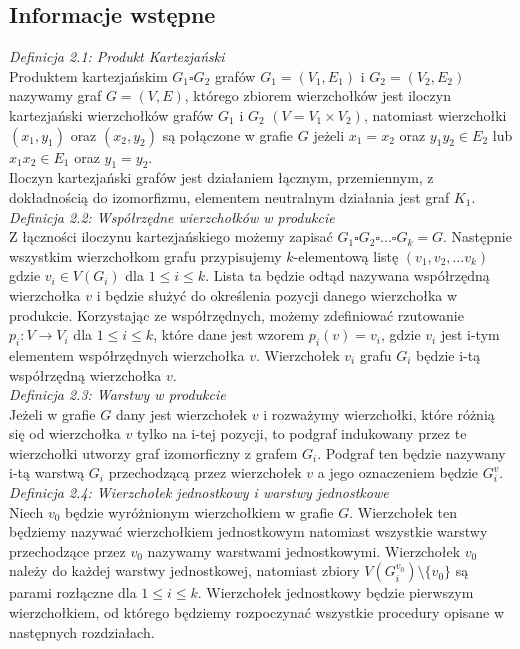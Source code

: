 \documentclass[12pt,a4paper,titlepage]{article}
\begin{document}
\subsection{Informacje wstępne}
\textit{Definicja 2.1: Produkt Kartezjański}\\
Produktem kartezjańskim $G_1 \square G_2 $ grafów $G_1 = (V_1 , E_1 ) $ i $ G_2 =(V_2 , E_2 ) $ nazywamy graf $G = (V, E)$, którego zbiorem wierzchołków jest iloczyn kartezjański wierzchołków grafów $G_1$ i $G_2$ $(V=V_1 \times V_2 )$, natomiast wierzchołki $(x_1, y_1)$ oraz $(x_2, y_2)$ są połączone w grafie $G$ jeżeli $x_1 = x_2$ oraz $y_1 y_2 \in E_2 $ lub $x_1 x_2 \in E_1 $ oraz $y_1 = y_2 $.\\
Iloczyn kartezjański grafów jest działaniem łącznym, przemiennym, z dokładnością do izomorfizmu, elementem neutralnym działania jest graf $K_1$.\\
\textit{Definicja 2.2: Współrzędne wierzchołków w produkcie}\\
Z łączności iloczynu kartezjańskiego możemy zapisać $G_1 \square G_2 \square ... \square G_k = G$. Następnie wszystkim wierzchołkom grafu przypisujemy $k$-elementową listę $(v_1, v_2 , ... v_k )$ gdzie $v_i \in V(G_i)$ dla $1 \leqslant i \leqslant k $. Lista ta będzie odtąd nazywana współrzędną wierzchołka $v$ i będzie służyć do określenia pozycji danego wierzchołka w produkcie. Korzystając ze współrzędnych, możemy zdefiniować rzutowanie $p_i : V \rightarrow V_i $ dla $1 \leqslant i \leqslant k $, które dane jest wzorem $p_i (v) = v_i $, gdzie $v_i$ jest i-tym elementem współrzędnych wierzchołka $v$. Wierzchołek $v_i$ grafu $G_i$ będzie i-tą współrzędną wierzchołka $v$. \\
\textit{Definicja 2.3: Warstwy w produkcie}\\
Jeżeli w grafie $G$ dany jest wierzchołek $v$ i rozważymy wierzchołki, które różnią się od wierzchołka $v$ tylko na i-tej pozycji, to podgraf indukowany przez te wierzchołki utworzy graf izomorficzny z grafem $G_i$. Podgraf ten będzie nazywany i-tą warstwą $G_i$ przechodzącą przez wierzchołek $v$ a jego oznaczeniem będzie $G_i ^v$.\\
\textit{Definicja 2.4: Wierzchołek jednostkowy i warstwy jednostkowe}\\
Niech $v_0$ będzie wyróżnionym wierzchołkiem w grafie $G$. Wierzchołek ten będziemy nazywać wierzchołkiem jednostkowym natomiast wszystkie warstwy przechodzące przez $v_0$ nazywamy warstwami jednostkowymi. Wierzchołek $v_0$ należy do każdej warstwy jednostkowej, natomiast zbiory $V(G_i ^{v_0}) \setminus \{v_0\}$ są parami rozłączne dla $1 \leqslant i \leqslant k $. Wierzchołek jednostkowy będzie pierwszym wierzchołkiem, od którego będziemy rozpoczynać wszystkie procedury opisane w następnych rozdziałach.
\end{document}
